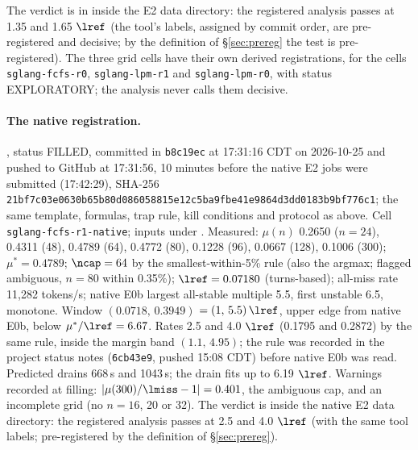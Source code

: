 \noindent The verdict is in  inside the E2 data directory: the registered analysis passes at 1.35 and 1.65 $\lref$ (the tool's labels, assigned by commit order, are pre-registered and decisive; by the definition of \S\ref{sec:prereg} the test is pre-registered). The three grid cells have their own derived registrations,  for the cells \texttt{sglang-fcfs-r0}, \texttt{sglang-lpm-r1} and \texttt{sglang-lpm-r0}, with status EXPLORATORY; the analysis never calls them decisive.

\paragraph{The native registration.} , status FILLED, committed in \texttt{b8c19ec} at 17:31:16 CDT on 2026-10-25 and pushed to GitHub at 17:31:56, 10 minutes before the native E2 jobs were submitted (17:42:29), SHA-256 \texttt{21bf7c03e0630b65b80d086058815e12\allowbreak c5ba9fbe41e9864d3dd0183b9bf776c1}; the same template, formulas, trap rule, kill conditions and protocol as above. Cell \texttt{sglang-fcfs-r1-native}; inputs under . Measured: $\mu(n)$ 0.2650 ($n=24$), 0.4311 (48), 0.4789 (64), 0.4772 (80), 0.1228 (96), 0.0667 (128), 0.1006 (300); $\mu^*=0.4789$; $\ncap=64$ by the smallest-within-5\% rule (also the argmax; flagged ambiguous, $n=80$ within 0.35\%); $\lref=0.07180$ (turns-based); all-miss rate 11,282 tokens/s; native E0b largest all-stable multiple 5.5, first unstable 6.5, monotone. Window $(0.0718,\,0.3949)$\sps{} $=(1,\,5.5)\,\lref$, upper edge from native E0b, below $\mu^*/\lref=6.67$. Rates 2.5 and 4.0 $\lref$ (0.1795 and 0.2872\sps) by the same rule, inside the margin band $(1.1,\,4.95)$; the rule was recorded in the project status notes (\texttt{6cb43e9}, pushed 15:08 CDT) before native E0b was read. Predicted drains 668\,s and 1043\,s; the drain fits up to 6.19 $\lref$. Warnings recorded at filling: $|\mu(300)/\lmiss-1|=0.401$, the ambiguous cap, and an incomplete grid (no $n=16$, 20 or 32). The verdict is  inside the native E2 data directory: the registered analysis passes at 2.5 and 4.0 $\lref$ (with the same tool labels; pre-registered by the definition of \S\ref{sec:prereg}).

